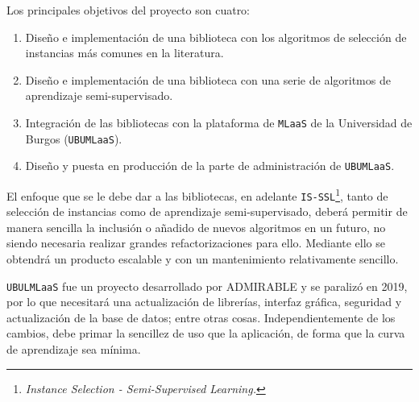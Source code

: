 Los principales objetivos del proyecto son cuatro:

\begin{enumerate}
\item Diseño e implementación de una biblioteca con los algoritmos de selección de instancias más comunes en la literatura.
\item Diseño e implementación de una biblioteca con una serie de algoritmos de aprendizaje semi-supervisado.
\item Integración de las bibliotecas con la plataforma de \texttt{MLaaS} de la Universidad de Burgos (\texttt{UBUMLaaS}).
\item Diseño y puesta en producción de la parte de administración de \texttt{UBUMLaaS}.
\end{enumerate}


El enfoque que se le debe dar a las bibliotecas, en adelante \texttt{IS-SSL}\footnote{\textit{Instance Selection - Semi-Supervised Learning.}}, tanto de selección de instancias como de aprendizaje semi-supervisado, deberá permitir de manera sencilla la inclusión o añadido de nuevos algoritmos en un futuro, no siendo necesaria realizar grandes refactorizaciones para ello. Mediante ello se obtendrá un producto escalable y con un mantenimiento relativamente sencillo.

\texttt{UBULMLaaS} fue un proyecto desarrollado por ADMIRABLE y se paralizó en 2019, por lo que necesitará una actualización de librerías, interfaz gráfica, seguridad y actualización de la base de datos; entre otras cosas. Independientemente de los cambios, debe primar la sencillez de uso que la aplicación, de forma que la curva de aprendizaje sea mínima.

